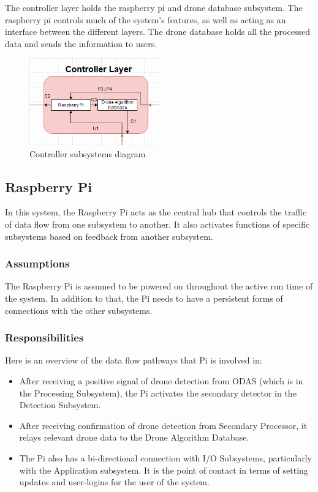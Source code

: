 The controller layer holds the raspberry pi and drone database subsystem.  The raspberry pi controls much of the system's features, as well as acting as an interface between the different layers.  The drone database holds all the processed data and sends the information to users.

\begin{figure}[h!]
	\centering
 	\includegraphics[width=0.50\textwidth]{images/controller.png}
 \caption{Controller subsystems diagram}
\end{figure}

\subsection{Raspberry Pi}
In this system, the Raspberry Pi acts as the central hub that controls the traffic of data flow from one subsystem to another. It also activates functions of specific subsystems based on feedback from another subsystem.

\subsubsection{Assumptions}
The Raspberry Pi is assumed to be powered on throughout the active run time of the system. In addition to that, the Pi needs to have a persistent forms of connections with the other subsystems.

\subsubsection{Responsibilities}
Here is an overview of the data flow pathways that Pi is involved in:
\begin{itemize}
  \item After receiving a positive signal of drone detection from ODAS (which is in the Processing Subsystem), the Pi activates the secondary detector in the Detection Subsystem. 
  \item After receiving confirmation of drone detection from Secondary Processor, it relays relevant drone data to the Drone Algorithm Database.
  \item The Pi also has a bi-directional connection with I/O Subsystems, particularly with the Application subsystem. It is the point of contact in terms of setting updates and user-logins for the user of the system.
\end{itemize}

